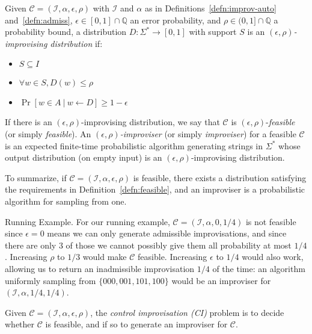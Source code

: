 \documentclass[a4paper,USenglish,numberwithinsect]{lipics}
\theoremstyle{plain}
\theoremstyle{definition}
\newcommand{\suchthat}{\:|\:}
\newcommand{\Q}{\mathbb{Q}}
\newcommand{\improvs}{I}
\newcommand{\valids}{A}
\begin{document}
\begin{definition}
Given $\mathcal{C} = (\mathcal{\improvs}, \alpha, \epsilon, \rho)$
with $\mathcal{\improvs}$ and $\alpha$ as in
Definitions~\ref{defn:improv-auto} and~\ref{defn:admiss}, $\epsilon \in [0,1]
\cap \Q$ an error probability, and $\rho \in (0,1] \cap \Q$ a
probability 
bound, a distribution $D : \Sigma^*
\rightarrow [0,1]$ with support $S$ is an
\emph{$(\epsilon,\rho)$-improvising distribution} if:
\begin{itemize}
\item $S \subseteq \improvs$
\item $\forall w \in S, D(w) \le \rho$
\item $\Pr[ w \in \valids \suchthat w \leftarrow D ] \ge 1 - \epsilon$
\end{itemize}
If there is an $(\epsilon,\rho)$-improvising distribution, we say that
$\mathcal{C}$ is $(\epsilon,\rho)$-\emph{feasible} (or simply {\em feasible}). An 
\emph{$(\epsilon,\rho)$-improviser} (or simply {\em improviser}) for a feasible $\mathcal{C}$ 
is an expected finite-time
probabilistic algorithm generating strings in $\Sigma^*$
whose output distribution (on empty
input) is an $(\epsilon,\rho)$-improvising distribution.
\label{defn:feasible}
\end{definition}

To summarize, if $\mathcal{C} = (\mathcal{\improvs}, \alpha, \epsilon, \rho)$ is feasible, there
exists a distribution satisfying the requirements in Definition~\ref{defn:feasible}, and an
improviser is a probabilistic algorithm for sampling from one.

\begin{subparagraph}{Running Example.}
For our running example, $\mathcal{C} = (\mathcal{\improvs}, \alpha,
0, 1/4)$ is not feasible since $\epsilon=0$ 
means we can only generate admissible improvisations, and since there
are only 3 of those we cannot possibly give them all probability at
most $1/4$. Increasing $\rho$ to $1/3$ would make $\mathcal{C}$
feasible. Increasing $\epsilon$ to $1/4$ would also work, allowing us
to return an inadmissible improvisation $1/4$ of the time:
an algorithm uniformly sampling from $\{000, 001, 101, 100\}$ would be
an improviser for $(\mathcal{\improvs}, \alpha, 1/4, 1/4)$. 
\end{subparagraph}

\begin{definition}
Given $\mathcal{C} = (\mathcal{\improvs}, \alpha, \epsilon, \rho)$,
the \emph{control improvisation (CI)} problem is to decide whether
$\mathcal{C}$ is feasible, and if so to generate an improviser for
$\mathcal{C}$. 
\end{definition}
\end{document}

